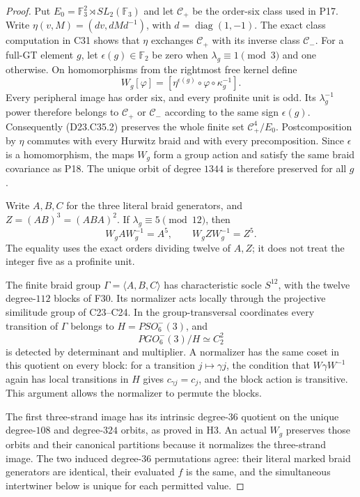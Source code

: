 \begin{proof}
Put $E_0=\mathbb F_3^2\rtimes SL_2(\mathbb F_3)$ and let
$\mathcal C_+$ be the order-six class used in P17. Write
$\eta(v,M)=(dv,dMd^{-1})$, with $d=\operatorname{diag}(1,-1)$.
The exact class computation in C31 shows that $\eta$ exchanges
$\mathcal C_+$ with its inverse class $\mathcal C_-$. For a
full-GT element $g$, let $\epsilon(g)\in\mathbb F_2$ be zero
when $\lambda_g\equiv1\pmod3$ and one otherwise. On
homomorphisms from the rightmost free kernel define
\[
 W_g[\varphi]=[\eta^{\epsilon(g)}\circ\varphi\circ
                         \kappa_g^{-1}].
\tag{D23.C35.2}
\]
Every peripheral image has order six, and every profinite
unit is odd. Its $\lambda_g^{-1}$ power therefore belongs
to $\mathcal C_+$ or $\mathcal C_-$ according to the same
sign $\epsilon(g)$. Consequently (D23.C35.2) preserves the
whole finite set $\mathcal C_+^4/E_0$. Postcomposition by
$\eta$ commutes with every Hurwitz braid and with every
precomposition. Since $\epsilon$ is a homomorphism, the
maps $W_g$ form a group action and satisfy the same braid
covariance as P18. The unique orbit of degree $1344$ is
therefore preserved for all $g$.

Write $A,B,C$ for the three literal braid generators, and
$Z=(AB)^3=(ABA)^2$. If $\lambda_g\equiv5\pmod {12}$, then
\[
 W_g A W_g^{-1}=A^5,\qquad W_g Z W_g^{-1}=Z^5.
\tag{D23.C35.3}
\]
The equality uses the exact orders dividing twelve of
$A,Z$; it does not treat the integer five as a profinite unit.

The finite braid group $\Gamma=\langle A,B,C\rangle$ has
characteristic socle $S^{12}$, with the twelve degree-$112$
blocks of F30. Its normalizer acts locally through the
projective similitude group of C23--C24. In the group-transversal
coordinates every transition of $\Gamma$ belongs to
$H=PSO^-_6(3)$, and
\[
                       PGO^-_6(3)/H\simeq C_2^2
\]
is detected by determinant and multiplier. A normalizer
has the same coset in this quotient on every block: for
a transition $j\mapsto\gamma j$, the condition that
$W\gamma W^{-1}$ again has local transitions in $H$ gives
$c_{\gamma j}=c_j$, and the block action is transitive.
This argument allows the normalizer to permute the blocks.

The first three-strand image has its intrinsic degree-$36$
quotient on the unique degree-$108$ and degree-$324$ orbits,
as proved in H3. An actual $W_g$ preserves those orbits and
their canonical partitions because it normalizes the
three-strand image. The two induced degree-$36$ permutations
agree: their literal marked braid generators are identical,
their evaluated $f$ is the same, and the simultaneous
intertwiner below is unique for each permitted value.


\end{proof}
